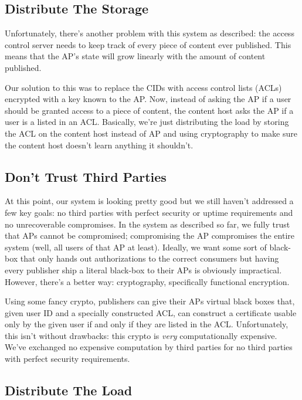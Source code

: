 \documentclass[pdftex,12pt,a4papaer]{report}
\begin{document}
\subsection{Distribute The Storage}

Unfortunately, there's another problem with this system as described: the access
control server needs to keep track of every piece of content ever published.
This means that the AP's state will grow linearly with the amount of content
published.

Our solution to this was to replace the CIDs with access control lists (ACLs)
encrypted with a key known to the AP. Now, instead of asking the AP if a user
should be granted access to a piece of content, the content host asks the AP if
a user is a listed in an ACL. Basically, we're just distributing the load by
storing the ACL on the content host instead of AP and using cryptography to make
sure the content host doesn't learn anything it shouldn't.

\subsection{Don't Trust Third Parties}

At this point, our system is looking pretty good but we still haven't addressed
a few key goals: no third parties with perfect security or uptime requirements
and no unrecoverable compromises. In the system as described so far, we fully
trust that APs cannot be compromised; compromising the AP compromises the entire
system (well, all users of that AP at least). Ideally, we want some sort of
black-box that only hands out authorizations to the correct consumers but having
every publisher ship a literal black-box to their APs is obviously
impractical. However, there's a better way: cryptography, specifically
functional encryption.

Using some fancy crypto, publishers can give their APs virtual black boxes
that, given user ID and a specially constructed ACL, can construct a certificate
usable only by the given user if and only if they are listed in the ACL.
Unfortunately, this isn't without drawbacks: this crypto is \emph{very}
computationally expensive. We've exchanged no expensive computation by third
parties for no third parties with perfect security requirements.

\subsection{Distribute The Load}
\end{document}
